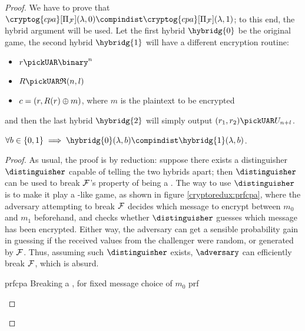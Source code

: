 \begin{proof}
    We have to prove that $\cryptog{cpa}[\Pi_{\F}](\lambda, 0) \compindist \cryptog{cpa}[\Pi_{\F}](\lambda, 1)$; to this end, the hybrid argument will be used. Let the first hybrid $\hybridg{0}$ be the original game, the second hybrid $\hybridg{1}$ will have a different encryption routine:

    \begin{itemize}
        \item $r \pickUAR \binary^n$
        \item $R \pickUAR \mathfrak{R}(n, l)$
        \item $c = (r, R(r) \oplus m)$, where $m$ is the plaintext to be encrypted
    \end{itemize}

    and then the last hybrid $\hybridg{2}$ will simply output $(r_1, r_2) \pickUAR U_{n+l}$.

    \begin{lemma}
        $\forall b \in \{0, 1\} \implies \hybridg{0}(\lambda, b) \compindist \hybridg{1}(\lambda, b)$.
    \end{lemma}

    \begin{proof}
        As usual, the proof is by reduction: suppose there exists a distinguisher $\distinguisher$ capable of telling the two hybrids apart; then $\distinguisher$ can be used to break $\mathcal{F}$'s property of being a \prf. The way to use $\distinguisher$ is to make it play a \cpa-like game, as shown in figure \ref{cryptoredux:prfcpa}\footnotemark, where the adversary attempting to break $\mathcal{F}$ decides which message to encrypt between $m_0$ and $m_1$ beforehand, and checks whether $\distinguisher$ guesses which message has been encrypted. Either way, the adversary can get a sensible probability gain in guessing if the received values from the challenger were random, or generated by $\mathcal{F}$. Thus, assuming such $\distinguisher$ exists, $\adversary$ can efficiently break $\mathcal{F}$, which is absurd.



        \begin{cryptoredux}
            {prfcpa}
            {Breaking a \prf, for fixed message choice of $m_0$}
            {prf}
            {}


\end{cryptoredux}
\end{proof}
\end{proof}

